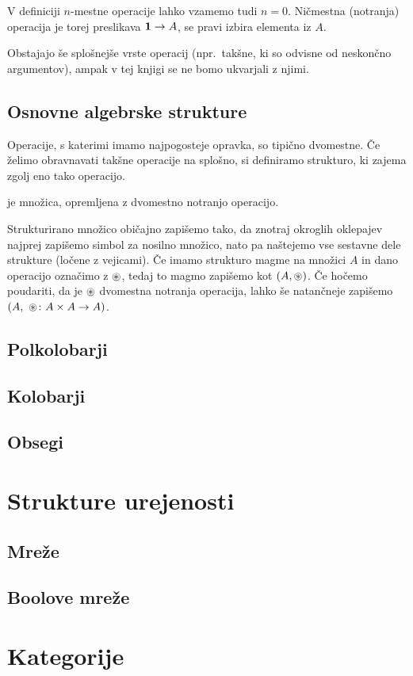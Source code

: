 V definiciji $n$-mestne operacije lahko vzamemo tudi $n = 0$. Ničmestna (notranja) operacija je torej preslikava $\mathtt{\mathbf{1}} \to A$, se pravi izbira elementa iz $A$.

Obstajajo še splošnejše vrste operacij (npr.~takšne, ki so odvisne od neskončno argumentov), ampak v tej knjigi se ne bomo ukvarjali z njimi.


\subsection{Osnovne algebrske strukture}

Operacije, s katerimi imamo najpogosteje opravka, so tipično dvomestne. Če želimo obravnavati takšne operacije na splošno, si definiramo strukturo, ki zajema zgolj eno tako operacijo.

\begin{definicija}
	 je množica, opremljena z dvomestno notranjo operacijo.
\end{definicija}

Strukturirano množico običajno zapišemo tako, da znotraj okroglih oklepajev najprej zapišemo simbol za nosilno množico, nato pa naštejemo vse sestavne dele strukture (ločene z vejicami). Če imamo strukturo magme na množici $A$ in dano operacijo označimo z ${\mathop{\circledast}}$, tedaj to magmo zapišemo kot $(A, {\mathop{\circledast}})$. Če hočemo poudariti, da je ${\mathop{\circledast}}$ dvomestna notranja operacija, lahko še natančneje zapišemo $(A,\ {\mathop{\circledast}}\colon A \times A \to A)$.



\subsection{Polkolobarji}
\subsection{Kolobarji}
\subsection{Obsegi}
\section{Strukture urejenosti}
\subsection{Mreže}
\subsection{Boolove mreže}
\section{Kategorije}



